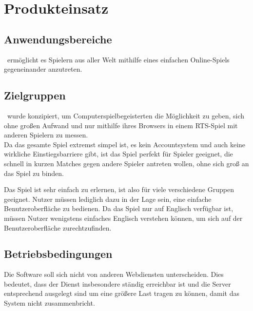 \section{Produkteinsatz}

\subsection{Anwendungsbereiche}
\vires\ ermöglicht es Spielern aus aller Welt mithilfe eines einfachen Online-Spiels gegeneinander anzutreten.

\subsection{Zielgruppen}
\vires\ wurde konzipiert, um Computerspielbegeisterten die Möglichkeit zu geben, sich ohne großen Aufwand und nur mithilfe ihres Browsers in einem RTS-Spiel mit anderen Spielern zu messen. \\ 
Da das gesamte Spiel extremst simpel ist, es kein Accountsystem und auch keine wirkliche Einstiegsbarriere gibt, ist das Spiel perfekt für Spieler geeignet, die schnell in kurzen Matches gegen andere Spieler antreten wollen, ohne sich groß an das Spiel zu binden.

Das Spiel ist sehr einfach zu erlernen, ist also für viele verschiedene Gruppen geeignet. Nutzer müssen lediglich dazu in der Lage sein, eine einfache Benutzeroberfläche zu bedienen. Da das Spiel nur auf Englisch verfügbar ist, müssen Nutzer wenigstens einfaches Englisch verstehen können, um sich auf der Benutzeroberfläche zurechtzufinden.

\subsection{Betriebsbedingungen}
Die Software soll sich nicht von anderen Webdiensten unterscheiden. Dies bedeutet, dass der Dienst insbesondere ständig erreichbar ist und die Server entsprechend ausgelegt sind um eine größere Last tragen zu können, damit das System nicht zusammenbricht.